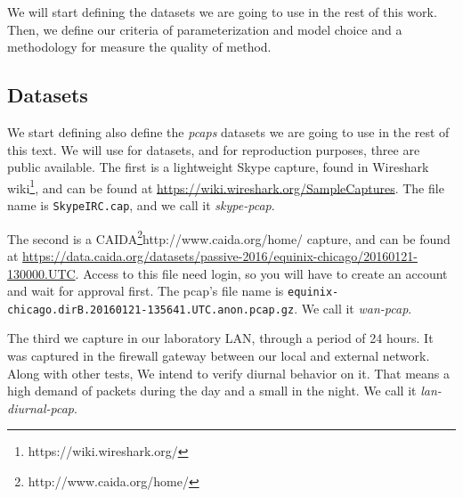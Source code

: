 We will start defining the datasets we are going to use in the rest of this work. Then, we define our criteria of parameterization and model choice and a methodology for measure the quality of method. 



\subsection{Datasets}

We start defining also define the \textit{pcaps} datasets we are going to use in the rest of this text. We will use for datasets, and for reproduction purposes, three are public available. 
The first is a lightweight Skype capture, found in  Wireshark wiki\footnote{https://wiki.wireshark.org/}, and can be found at \href{https://wiki.wireshark.org/SampleCaptures}{https://wiki.wireshark.org/SampleCaptures}. The file name is \texttt{SkypeIRC.cap}, and we call it \textit{skype-pcap}.

The second is a CAIDA\footnote{http://www.caida.org/home/}{http://www.caida.org/home/} capture, and can be found at  \href{https://data.caida.org/datasets/passive-2016/equinix-chicago/20160121-130000.UTC}{https://data.caida.org/datasets/passive-2016/equinix-chicago/20160121-130000.UTC}. Access to this file need login, so you will have to create an account and wait for approval first. The pcap's file name is \texttt{equinix-chicago.dirB.20160121-135641.UTC.anon.pcap.gz}. We call it \textit{wan-pcap}.

The third we capture in our laboratory LAN, through a period of 24 hours. It was captured in the firewall gateway between our local and external network. Along with other tests, We intend to verify diurnal behavior on it. That means a high demand of packets during the day and a small in the night. We call it \textit{lan-diurnal-pcap}.


